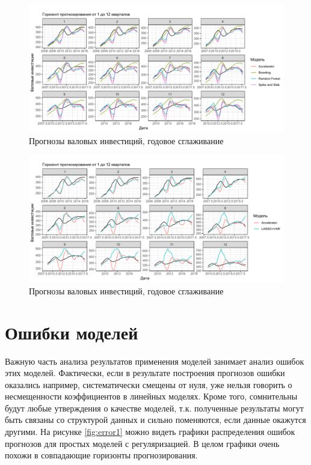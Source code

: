\begin{figure}[hp]
    \centering
    \includegraphics[width = \textwidth]{smooth3.pdf}
    \caption{Прогнозы валовых инвестиций, годовое сглаживание}
    \label{fig:smooth3}
\end{figure}


\begin{figure}[hp]
    \centering
    \includegraphics[width = \textwidth]{smooth4.pdf}
    \caption{Прогнозы валовых инвестиций, годовое сглаживание}
    \label{fig:smooth4}
\end{figure}
\section{Ошибки моделей}
Важную часть анализа результатов применения моделей занимает анализ ошибок этих моделей. Фактически, если в результате построения прогнозов ошибки оказались например, систематически смещены от нуля, уже нельзя говорить о несмещенности коэффициентов в линейных моделях. Кроме того, сомнительны будут любые утверждения о качестве моделей, т.к. полученные результаты могут быть связаны со структурой данных и сильно поменяются, если данные окажутся другими. На рисунке \ref{fig:error1} можно видеть графики распределения ошибок прогнозов для простых моделей с регуляризацией. В целом графики очень похожи в совпадающие горизонты прогнозирования.

